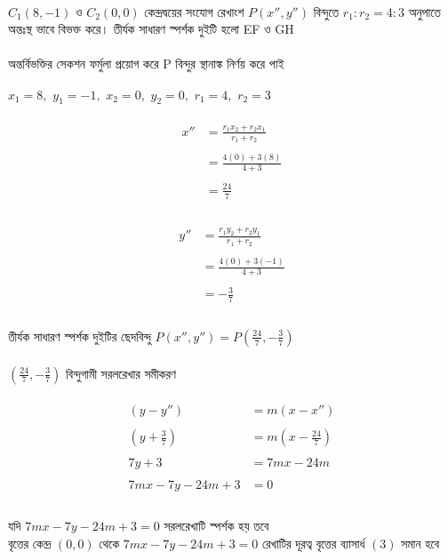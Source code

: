 \documentclass{article}
\begin{document}
	\\ 
	$C_1(8,-1)$ ও $C_2(0,0)$ কেন্দ্রদ্বয়ের সংযোগ রেখাংশ $P(x'',y'')$ বিন্দুতে  $r_1:r_2=4:3$ অনুপাতে অন্তঃস্থ ভাবে বিভক্ত করে। তীর্যক সাধারণ স্পর্শক দুইটি হলো EF ও  GH \\ 
	\\ 
	অন্তর্বিভক্তির সেকশন ফর্মুলা প্রয়োগ করে P বিন্দুর স্থানাঙ্ক নির্ণয় করে পাই  \\
	\\ 
	$x_1=8,\,\,y_1=-1,\,\,x_2=0,\,\,y_2=0,\,\,r_1=4,\,\,r_2=3$\\
	\\
	\begin{align*}
		x''&=\frac{r_1x_2+r_2x_1}{r_1+r_2}\\
		\\
		&=\frac{4(0)+3(8)}{4+3}\\
		\\
		&=\frac{24}{7}\\
	\end{align*}
	\\
	\begin{align*}
		y''&=\frac{r_1y_2+r_2y_1}{r_1+r_2}\\
		\\
		&=\frac{4(0)+3(-1)}{4+3}\\
		\\
		&=-\frac{3}{7}\\
	\end{align*}
	\\
	তীর্যক সাধারণ স্পর্শক দুইটির ছেদবিন্দু $P(x'',y'')=P\left(\frac{24}{7},-\frac{3}{7}\right)$\\
	\\
	$\left(\frac{24}{7},-\frac{3}{7}\right)$ বিন্দুগামী সরলরেখার  সমীকরণ \\
	\\ 
	\begin{align*}
		(y-y'')&=m(x-x'')\\
		\\
		(y+\frac{3}{7})&=m(x-\frac{24}{7})\\
		\\
		7y+3&=7mx-24m\\
		\\
		7mx-7y-24m+3&=0\\
	\end{align*}
	\\
	যদি $7mx-7y-24m+3=0$ সরলরেখাটি স্পর্শক হয় তবে \\
	বৃত্তের কেন্দ্র $(0,0)$ থেকে $7mx-7y-24m+3=0$ রেখাটির  দূরত্ব  বৃত্তের ব্যাসার্ধ $(3)$ সমান হবে \\
\end{document}

